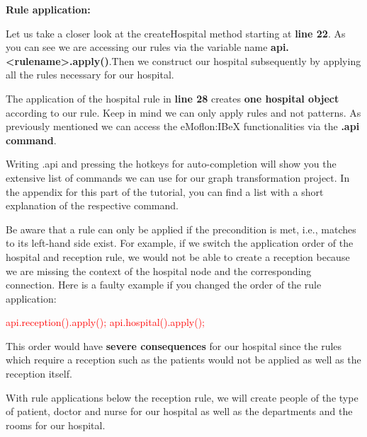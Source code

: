 \textbf{Rule application:}

Let us take a closer look at the \textsf{createHospital} method starting at \textbf{line 22}.\newline
As you can see we are accessing our rules via the variable name \textbf{api.<rulename>.apply()}.\newline Then we construct our hospital subsequently by applying all the rules necessary for our hospital.\newline

The application of the hospital rule in \textbf{line 28} creates \textbf{one hospital object} according to our rule. Keep in mind we can only apply rules and not patterns. As previously mentioned we can access the eMoflon:IBeX functionalities via the \textbf{.api command}.\newline

Writing \textsf{.api} and pressing the hotkeys for auto-completion will show you the extensive list of commands we can use for our graph transformation project. In the appendix for this part of the tutorial, you can find a list with a short explanation of the respective command.\newline

Be aware that a rule can only be applied if the precondition is met, i.e., matches to its left-hand side exist.\newline
For example, if we switch the application order of the hospital and reception rule, we would not be able to create a reception because we are missing the context of the hospital node and the corresponding connection.\newline
Here is a faulty example if you changed the order of the rule application:\newline

\textcolor{red}{api.reception().apply();}\newline
\textcolor{red}{api.hospital().apply();}\newline

This order would have \textbf{severe consequences} for our hospital since the rules which require a reception such as the patients would not be applied as well as the reception itself. \newline

With rule applications below the reception rule, we will create people of the type of patient, doctor and nurse for our hospital as well as the departments and the rooms for our hospital.\newline

